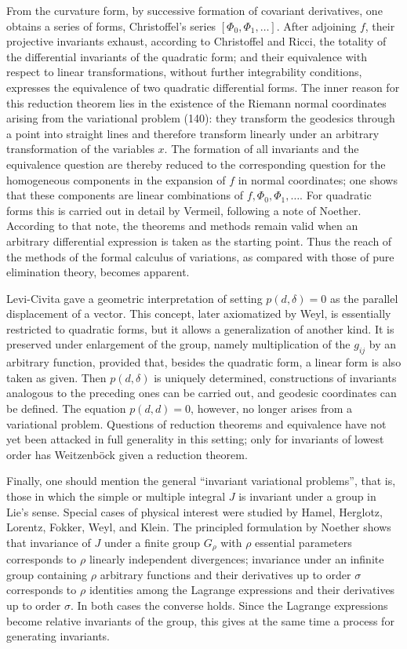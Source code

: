 \documentclass[12pt]{article}
\begin{document}
From the curvature form, by successive formation of covariant derivatives, one obtains a series of forms, Christoffel's series $[\Phi_0,\Phi_1,\ldots]$. After adjoining $f$, their projective invariants exhaust, according to Christoffel and Ricci, the totality of the differential invariants of the quadratic form; and their equivalence with respect to linear transformations, without further integrability conditions, expresses the equivalence of two quadratic differential forms. The inner reason for this reduction theorem lies in the existence of the Riemann normal coordinates arising from the variational problem (140): they transform the geodesics through a point into straight lines and therefore transform linearly under an arbitrary transformation of the variables $x$. The formation of all invariants and the equivalence question are thereby reduced to the corresponding question for the homogeneous components in the expansion of $f$ in normal coordinates; one shows that these components are linear combinations of $f,\Phi_0,\Phi_1,\ldots$. For quadratic forms this is carried out in detail by Vermeil, following a note of Noether. According to that note, the theorems and methods remain valid when an arbitrary differential expression is taken as the starting point. Thus the reach of the methods of the formal calculus of variations, as compared with those of pure elimination theory, becomes apparent.

Levi-Civita gave a geometric interpretation of setting $p(d,\delta)=0$ as the parallel displacement of a vector. This concept, later axiomatized by Weyl, is essentially restricted to quadratic forms, but it allows a generalization of another kind. It is preserved under enlargement of the group, namely multiplication of the $g_{ij}$ by an arbitrary function, provided that, besides the quadratic form, a linear form is also taken as given. Then $p(d,\delta)$ is uniquely determined, constructions of invariants analogous to the preceding ones can be carried out, and geodesic coordinates can be defined. The equation $p(d,d)=0$, however, no longer arises from a variational problem. Questions of reduction theorems and equivalence have not yet been attacked in full generality in this setting; only for invariants of lowest order has Weitzenböck given a reduction theorem.

Finally, one should mention the general ``invariant variational problems'', that is, those in which the simple or multiple integral $J$ is invariant under a group in Lie's sense. Special cases of physical interest were studied by Hamel, Herglotz, Lorentz, Fokker, Weyl, and Klein. The principled formulation by Noether shows that invariance of $J$ under a finite group $G_\rho$ with $\rho$ essential parameters corresponds to $\rho$ linearly independent divergences; invariance under an infinite group containing $\rho$ arbitrary functions and their derivatives up to order $\sigma$ corresponds to $\rho$ identities among the Lagrange expressions and their derivatives up to order $\sigma$. In both cases the converse holds. Since the Lagrange expressions become relative invariants of the group, this gives at the same time a process for generating invariants.
\end{document}
